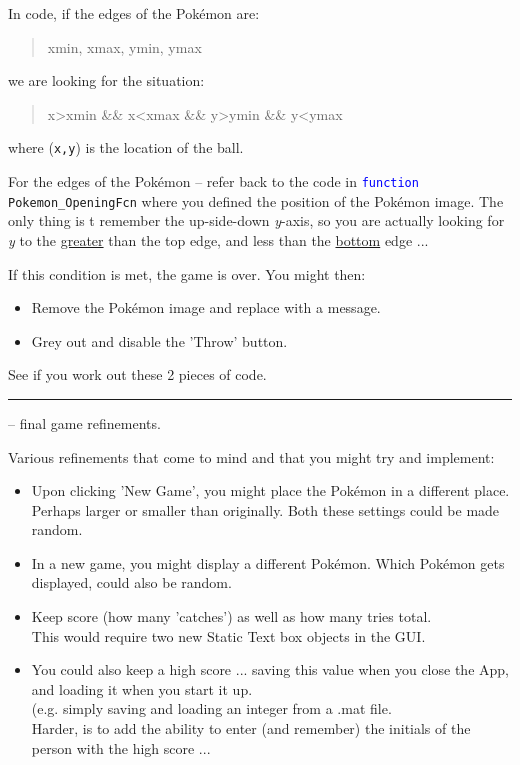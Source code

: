 \documentclass{tufte-book} %
\newenvironment{docspec}{\begin{quotation}\ttfamily\parskip0pt\parindent0pt\ignorespaces}{\end{quotation}}
\begin{document}
In code, if the edges of the Pok\'emon are:
\begin{docspec}
xmin, xmax, ymin, ymax
\end{docspec}
we are looking for the situation:
\begin{docspec}
x>xmin \&\& x<xmax \&\& y>ymin \&\& y<ymax
\end{docspec}
where (\texttt{x,y}) is the location of the ball.

For the edges of the Pok\'emon -- refer back to the code in \texttt{\textcolor{blue}{function} Pokemon\_OpeningFcn} where you defined the position of the Pok\'emon image. The only thing is t remember the up-side-down \textit{y}-axis, so you are actually looking for \textit{y} to the \uline{greater} than the top edge, and less than the \uline{bottom} edge ...

If this condition is met, the game is over. You might then:
\begin{itemize}[noitemsep]
\setlength{\itemindent}{.2in}
\item Remove the Pok\'emon image and replace with a message.
\item Grey out and disable the 'Throw' button.
\end{itemize}

See if you work out these 2 pieces of code.

\vspace{1mm}
\noindent\rule{4cm}{0.5pt}
\vspace{-2mm}

 -- final game refinements.

Various refinements that come to mind and that you might try and implement:

\begin{itemize}[noitemsep]
\item Upon clicking 'New Game', you might place the Pok\'emon in a different place. Perhaps larger or smaller than originally. Both these settings could be made random.
\item In a new game, you might display a different Pok\'emon. Which Pok\'emon gets displayed, could also be random.
\item Keep score (how many 'catches') as well as how many tries total.
\\This would require two new \textsf{Static Text} box objects in the GUI.
\item You could also keep a high score ... saving this value when you close the App, and loading it when you start it up.
\\(e.g. simply saving and loading an integer from a \textsf{.mat} file.
\\Harder, is to add the ability to enter (and remember) the initials of the person with the high score ...
\end{itemize}
\end{document}
